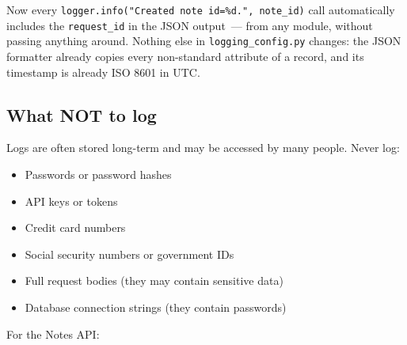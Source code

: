 \noindent{}Now every \texttt{logger.}\allowbreak{}\texttt{info("Created\ note\ id=}\allowbreak{}\texttt{\%d.}\allowbreak{}\texttt{",}\allowbreak{}\texttt{\ note\_}\allowbreak{}\texttt{id)} call automatically includes the \texttt{request\_id} in the JSON output~--- from any module, without passing anything around. Nothing else in \texttt{logging\_config.py} changes: the JSON formatter already copies every non-standard attribute of a record, and its timestamp is already ISO 8601 in UTC.

\subsection*{What NOT to log}\label{35-observability:what-not-to-log}

Logs are often stored long-term and may be accessed by many people. Never log:

\begin{itemize}
\tightlist
\item
  Passwords or password hashes
\item
  API keys or tokens
\item
  Credit card numbers
\item
  Social security numbers or government IDs
\item
  Full request bodies (they may contain sensitive data)
\item
  Database connection strings (they contain passwords)
\end{itemize}

\noindent{}For the Notes API:

\begin{codebox}[short]

\begin{Shaded}
\begin{Highlighting}[]

\OperatorTok{=}
\StringTok{/}\NormalTok{))}
\end{Highlighting}
\end{Shaded}

\end{codebox}

